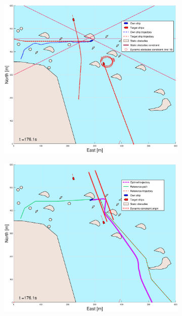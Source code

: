 \begin{figure}[ht]\ContinuedFloat
    \begin{subfigure}[b]{0.49\textwidth}
        \centering
        \includegraphics[width=\textwidth]{Images/Figures/skjergard_m_trafikk_NEW/_Simple_1fig1_time=176}
    \end{subfigure}
    \hfill
    \begin{subfigure}[b]{0.499\textwidth}
        \centering
        \includegraphics[width=\textwidth]{Images/Figures/skjergard_m_trafikk_NEW/_Simple_1fig999_time=176}

\end{subfigure}
\end{figure}
